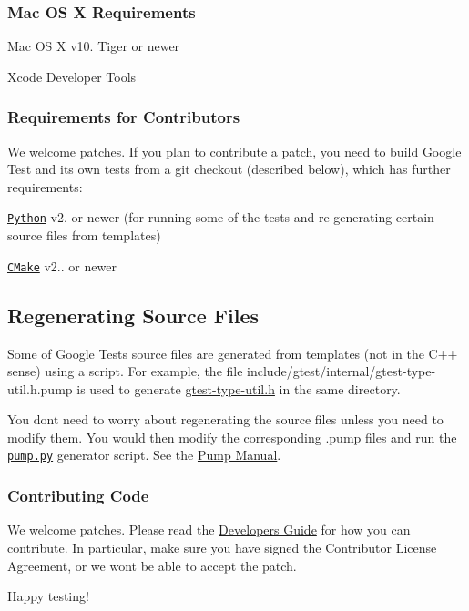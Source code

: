 \subsubsection*{Mac OS X Requirements}


\begin{DoxyItemize}
\item Mac OS X v10. Tiger or newer
\item Xcode Developer Tools
\end{DoxyItemize}

\subsubsection*{Requirements for Contributors}

We welcome patches. If you plan to contribute a patch, you need to build Google Test and its own tests from a git checkout (described below), which has further requirements\+:


\begin{DoxyItemize}
\item \href{https://www.python.org/}{\tt Python} v2. or newer (for running some of the tests and re-\/generating certain source files from templates)
\item \href{https://cmake.org/}{\tt C\+Make} v2.. or newer
\end{DoxyItemize}

\subsection*{Regenerating Source Files}

Some of Google Test\textquotesingle{}s source files are generated from templates (not in the C++ sense) using a script. For example, the file include/gtest/internal/gtest-\/type-\/util.\+h.\+pump is used to generate \hyperlink{gtest-type-util_8h}{gtest-\/type-\/util.\+h} in the same directory.

You don\textquotesingle{}t need to worry about regenerating the source files unless you need to modify them. You would then modify the corresponding {\ttfamily .pump} files and run the \textquotesingle{}\href{googletest/scripts/pump.py}{\tt pump.\+py}\textquotesingle{} generator script. See the \hyperlink{PumpManual_8md}{Pump Manual}.

\subsubsection*{Contributing Code}

We welcome patches. Please read the \hyperlink{googletest_2docs_2DevGuide_8md}{Developer\textquotesingle{}s Guide} for how you can contribute. In particular, make sure you have signed the Contributor License Agreement, or we won\textquotesingle{}t be able to accept the patch.

Happy testing! 